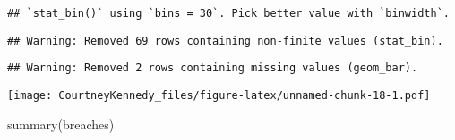 \documentclass[
]{article}
\newenvironment{Shaded}{\begin{snugshade}}{\end{snugshade}}
\newcommand{\FunctionTok}[1]{\textcolor[rgb]{0.00,0.00,0.00}{#1}}
\newcommand{\NormalTok}[1]{#1}
\begin{document}
\begin{verbatim}
## `stat_bin()` using `bins = 30`. Pick better value with `binwidth`.
\end{verbatim}

\begin{verbatim}
## Warning: Removed 69 rows containing non-finite values (stat_bin).
\end{verbatim}

\begin{verbatim}
## Warning: Removed 2 rows containing missing values (geom_bar).
\end{verbatim}

\texttt{[image: CourtneyKennedy\_files/figure-latex/unnamed-chunk-18-1.pdf]}

\begin{Shaded}
\begin{Highlighting}[]
\FunctionTok{summary}\NormalTok{(breaches)}
\end{Highlighting}
\end{Shaded}
\end{document}
